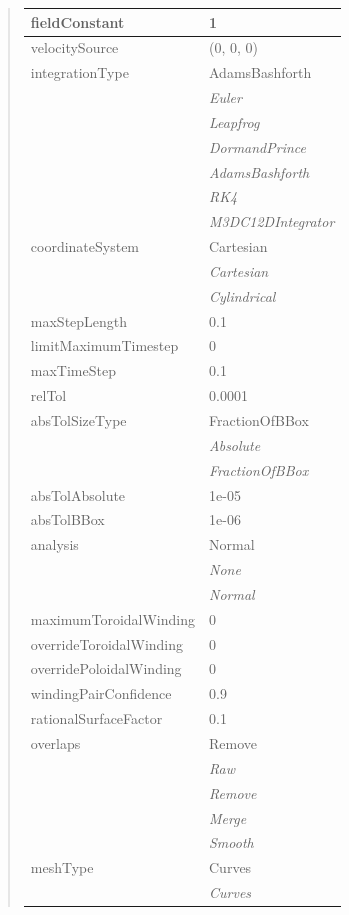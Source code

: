 \documentclass[letterpaper,10pt,english]{sphinxmanual}
\begin{document}
\begin{quote}
\begin{longtable}{|l|l|}
\hline
fieldConstant
 & 
1
\\
\hline
velocitySource
 & 
(0, 0, 0)
\\
\hline
integrationType
 & 
AdamsBashforth
\\
\hline & 
\emph{Euler}
\\
\hline & 
\emph{Leapfrog}
\\
\hline & 
\emph{DormandPrince}
\\
\hline & 
\emph{AdamsBashforth}
\\
\hline & 
\emph{RK4}
\\
\hline & 
\emph{M3DC12DIntegrator}
\\
\hline
coordinateSystem
 & 
Cartesian
\\
\hline & 
\emph{Cartesian}
\\
\hline & 
\emph{Cylindrical}
\\
\hline
maxStepLength
 & 
0.1
\\
\hline
limitMaximumTimestep
 & 
0
\\
\hline
maxTimeStep
 & 
0.1
\\
\hline
relTol
 & 
0.0001
\\
\hline
absTolSizeType
 & 
FractionOfBBox
\\
\hline & 
\emph{Absolute}
\\
\hline & 
\emph{FractionOfBBox}
\\
\hline
absTolAbsolute
 & 
1e-05
\\
\hline
absTolBBox
 & 
1e-06
\\
\hline
analysis
 & 
Normal
\\
\hline & 
\emph{None}
\\
\hline & 
\emph{Normal}
\\
\hline
maximumToroidalWinding
 & 
0
\\
\hline
overrideToroidalWinding
 & 
0
\\
\hline
overridePoloidalWinding
 & 
0
\\
\hline
windingPairConfidence
 & 
0.9
\\
\hline
rationalSurfaceFactor
 & 
0.1
\\
\hline
overlaps
 & 
Remove
\\
\hline & 
\emph{Raw}
\\
\hline & 
\emph{Remove}
\\
\hline & 
\emph{Merge}
\\
\hline & 
\emph{Smooth}
\\
\hline
meshType
 & 
Curves
\\
\hline & 
\emph{Curves}
\\

\end{longtable}
\end{quote}
\end{document}
